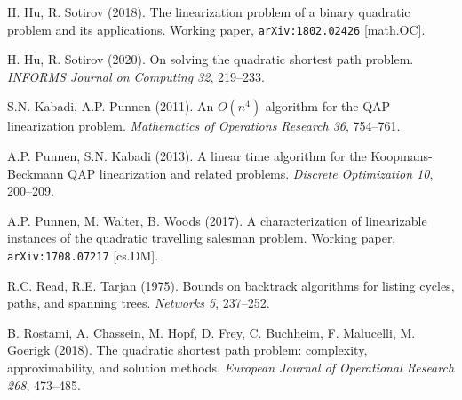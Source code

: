\documentclass[runningheads]{llncs}
\begin{document}
\begin{thebibliography}{18}
{H. Hu, R. Sotirov} (2018).
The linearization problem of a binary quadratic problem and its applications.
Working paper, {\tt arXiv:1802.02426} [math.OC].

{H. Hu, R. Sotirov} (2020).
On solving the quadratic shortest path problem.
\emph{INFORMS Journal on Computing 32}, 219--233.

{S.N. Kabadi, A.P. Punnen} (2011).
An $O(n^4)$ algorithm for the {QAP} linearization problem.
\emph{Mathematics of Operations Research 36}, 754--761.

{A.P. Punnen, S.N. Kabadi} (2013).
A linear time algorithm for the Koopmans-Beck\-mann {QAP} linearization and related problems.
\emph{Discrete Optimization 10}, 200--209.

{A.P. Punnen, M. Walter, B. Woods} (2017).
A characterization of linearizable instances of the quadratic travelling salesman problem.
Working paper, {\tt arXiv:1708.07217} [cs.DM].

{R.C. Read, R.E. Tarjan} (1975).
Bounds on backtrack algorithms for listing cycles, paths, and spanning trees.
\emph{Networks 5}, 237--252.

{B. Rostami, A. Chassein, M. Hopf, D. Frey, C. Buchheim, F. Malucelli, M. Goerigk} (2018).
The quadratic shortest path problem: complexity, approximability, and solution methods.
\emph{European Journal of Operational Research 268}, 473--485.

\end{thebibliography}
\end{document}
